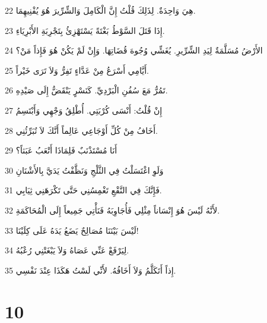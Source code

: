 \par 22 هِيَ وَاحِدَةٌ. لِذَلِكَ قُلْتُ إِنَّ الْكَامِلَ وَالشِّرِّيرَ هُوَ يُفْنِيهِمَا.
\par 23 إِذَا قَتَلَ السَّوْطُ بَغْتَةً يَسْتَهْزِئُ بِتَجْرِبَةِ الأَبْرِيَاءِ.
\par 24 الأَرْضُ مُسَلَّمَةٌ لِيَدِ الشِّرِّيرِ. يُغَشِّي وُجُوهَ قُضَاتِهَا. وَإِنْ لَمْ يَكُنْ هُوَ فَإِذاً مَنْ؟
\par 25 أَيَّامِي أَسْرَعُ مِنْ عَدَّاءٍ تَفِرُّ وَلاَ تَرَى خَيْراً.
\par 26 تَمُرُّ مَعَ سُفُنِ الْبَرْدِيِّ. كَنَسْرٍ يَنْقَضُّ إِلَى صَيْدِهِ.
\par 27 إِنْ قُلْتُ: أَنْسَى كُرْبَتِي. أُطْلِقُ وَجْهِي وَأَبْتَسِمُ
\par 28 أَخَافُ مِنْ كُلِّ أَوْجَاعِي عَالِماً أَنَّكَ لاَ تُبَرِّئُنِي.
\par 29 أَنَا مُسْتَذْنَبٌ فَلِمَاذَا أَتْعَبُ عَبَثاً؟
\par 30 وَلَوِ اغْتَسَلْتُ فِي الثَّلْجِ وَنَظَّفْتُ يَدَيَّ بِالأَشْنَانِ
\par 31 فَإِنَّكَ فِي النَّقْعِ تَغْمِسُنِي حَتَّى تَكْرَهَنِي ثِيَابِي.
\par 32 لأَنَّهُ لَيْسَ هُوَ إِنْسَاناً مِثْلِي فَأُجَاوِبَهُ فَنَأْتِي جَمِيعاً إِلَى الْمُحَاكَمَةِ.
\par 33 لَيْسَ بَيْنَنَا مُصَالِحٌ يَضَعُ يَدَهُ عَلَى كِلَيْنَا!
\par 34 لِيَرْفَعْ عَنِّي عَصَاهُ وَلاَ يَبْغَتْنِي رُعْبُهُ.
\par 35 إِذاً أَتَكَلَّمُ وَلاَ أَخَافُهُ. لأَنِّي لَسْتُ هَكَذَا عِنْدَ نَفْسِي.

\chapter{10}

